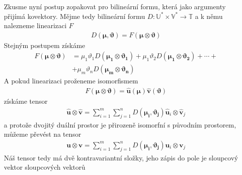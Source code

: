 \documentclass[a5paper,12pt]{amsbook}
\theoremstyle{definition}
\newcommand{\myvec}[1]{\bm{#1}}
\newcommand{\myspace}[1]{\mathbb{#1}}
\newcommand{\mycocovec}[1]{\mathbf{\widehat{#1}}}
\begin{document}
\medskip\noindent
Zkusme nyní postup zopakovat pro bilineární formu, která jako argumenty přijímá
kovektory. Mějme tedy bilineární formu $D:\myspace{U}^*\times\myspace{V}^*\rightarrow\myspace{T}$
a k němu nalezneme linearizaci $F$
\begin{equation*}
\begin{split}
D(\myvec{\mu}, \myvec{\vartheta}) = F(\myvec{\mu}\otimes\myvec{\vartheta})
\end{split}
\end{equation*}
Stejným postupem získáme
\begin{equation*}
\begin{split}
F(\myvec{\mu}\otimes\myvec{\vartheta}) &= \mu_1\vartheta_1 D(\myvec{\mu_1}\otimes\myvec{\vartheta_1})
  + \mu_1\vartheta_2 D(\myvec{\mu_1}\otimes\myvec{\vartheta_2})
  + \cdots + \\
  & + \mu_m\vartheta_n D(\myvec{\mu_m}\otimes\myvec{\vartheta_n})
\end{split}
\end{equation*}
A pokud linearizaci proženeme isomorfismem
\begin{equation*}
\begin{split}
F(\myvec{\mu}\otimes\myvec{\vartheta}) = \mycocovec{u}(\myvec{\mu})\mycocovec{v}(\myvec{\vartheta})
\end{split}
\end{equation*}
získáme tensor
\begin{equation*}
\begin{split}
\mycocovec{u}\otimes\mycocovec{v} = \sum_{i=1}^{m}\sum_{j=1}^{n}D(\myvec{\mu_i}, \myvec{\vartheta_j})
  \mycocovec{u}_i\otimes\mycocovec{v}_j
\end{split}
\end{equation*}
a protože dvojitý duální prostor je přirozeně isomorfní s původním prostorem, můžeme převést na tensor
\begin{equation*}
\begin{split}
\myvec{u}\otimes\myvec{v} = \sum_{i=1}^{m}\sum_{j=1}^{n}D(\myvec{\mu_i}, \myvec{\vartheta_j})
  \myvec{u}_i\otimes\myvec{v}_j
\end{split}
\end{equation*}
Náš tensor tedy  má dvě kontravariantní složky, jeho zápis do pole je sloupcový vektor sloupcových
vektorů
\end{document}
